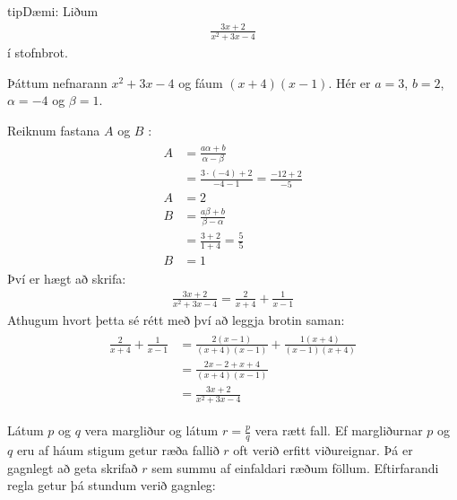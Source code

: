 \documentclass[a4paper,10pt,icelandic]{sphinxmanual}
\begin{document}
\begin{sphinxadmonition}{tip}{Dæmi:}
Liðum
\begin{equation*}
\begin{split}\frac{3x+2}{x^2+3x-4}\end{split}
\end{equation*}
í stofnbrot.


Þáttum nefnarann \(x^2+3x-4\) og fáum \((x+4)(x-1)\).
Hér er \(a=3\), \(b=2\), \(\alpha = -4\)  og \(\beta=1\).

Reiknum fastana \(A\) og \(B\) :
\begin{equation*}
\begin{split}\begin{aligned}
  A& = \frac{a\alpha+b}{\alpha-\beta} \\
  &= \frac{3\cdot(-4)+2}{-4-1} =\frac{-12+2}{-5} \\
  A&=2 \\
  B&= \frac{a\beta +b}{\beta-\alpha} \\
  &= \frac{3+2}{1+4} =\frac{5}{5} \\
  B&=1
\end{aligned}\end{split}
\end{equation*}
Því er hægt að skrifa:
\begin{equation*}
\begin{split}\frac{3x+2}{x^2+3x-4} = \frac{2}{x+4} + \frac{1}{x-1}\end{split}
\end{equation*}
Athugum hvort þetta sé rétt með því að leggja brotin saman:
\begin{equation*}
\begin{split}\begin{aligned}
  \frac{2}{x+4} + \frac{1}{x-1} &= \frac{2(x-1)}{(x+4)(x-1)}+\frac{1(x+4)}{(x-1)(x+4)} \\
  &=\frac{2x-2+x+4}{(x+4)(x-1)} \\
  &=\frac{3x+2}{x^2+3x-4}
\end{aligned}\end{split}
\end{equation*}\end{sphinxadmonition}

Látum \(p\) og \(q\) vera margliður og látum \(r=\frac{p}{q}\) vera rætt fall. Ef margliðurnar \(p\) og \(q\) eru af háum stigum getur ræða fallið \(r\) oft verið erfitt viðureignar. Þá er gagnlegt að geta skrifað \(r\) sem summu af einfaldari ræðum föllum. Eftirfarandi regla getur þá stundum verið gagnleg:
\end{document}
